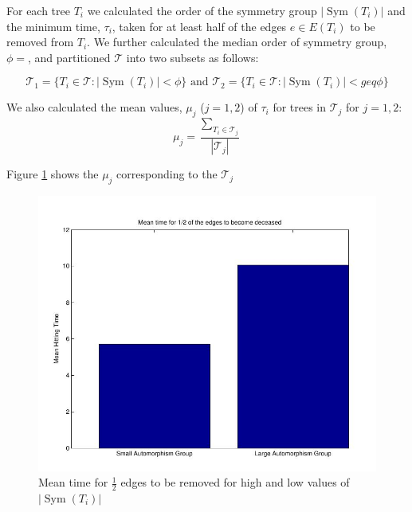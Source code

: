 \documentclass[12pt]{article} %
\theoremstyle{definition}
\DeclareMathOperator{\Sym}{Sym}
\begin{document}
For each tree $T_i$ we calculated the order of the symmetry group $|\Sym(T_i)|$ and the minimum time, $\tau_i$, taken for at least half of the edges $e \in E(T_i)$  to be removed from $T_i$.  We further calculated the median order of symmetry group, $\phi = $, and partitioned $\mathcal{T}$ into two subsets as follows: 

\[\mathcal{T}_{1} = \{T_i \in \mathcal{T} : |\Sym(T_i)| < \phi\} \text{      and      }\mathcal{T}_{2} = \{T_i \in \mathcal{T} : |\Sym(T_i)| <geq \phi\} \]


We also calculated the mean values, $\mu_j$ ($j = 1,2$) of $\tau_i$ for trees in $\mathcal{T}_j$ for $j = 1,2$:
\[\mu_j = \frac{\sum_{T_i \in \mathcal{T}_j}}{|\mathcal{T}_j|}\]

Figure \ref{t12} shows the $\mu_j$ corresponding to the $\mathcal{T}_j$

\begin{figure}[H]

              \centering
               \includegraphics[scale=0.5]{half.jpeg}
                \caption{Mean time for $\frac{1}{2}$ edges to be removed for high and low values of $|\Sym(T_i)|$}\label{t12}
\end{figure}

\end{document}
